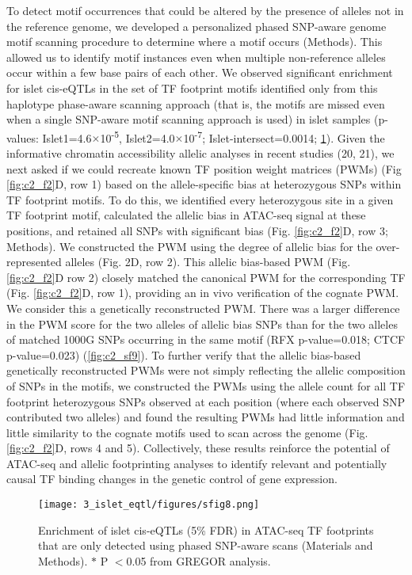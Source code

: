 To detect motif occurrences that could be altered by the presence of alleles not in the reference genome, we developed a personalized phased SNP-aware genome motif scanning procedure to determine where a motif occurs (Methods). This allowed us to identify motif instances even when multiple non-reference alleles occur within a few base pairs of each other. We observed significant enrichment for islet cis-eQTLs in the set of TF footprint motifs identified only from this haplotype phase-aware scanning approach (that is, the motifs are missed even when a single SNP-aware motif scanning approach is used) in islet samples (p-values: Islet1=4.6$\times$10\textsuperscript{-5}, Islet2=4.0$\times$10\textsuperscript{-7}; Islet-intersect=0.0014; \ref{fig:c2_sf8}). Given the informative chromatin accessibility allelic analyses in recent studies (20, 21), we next asked if we could recreate known TF position weight matrices (PWMs) (Fig \ref{fig:c2_f2}D, row 1) based on the allele-specific bias at heterozygous SNPs within TF footprint motifs. To do this, we identified every heterozygous site in a given TF footprint motif, calculated the allelic bias in ATAC-seq signal at these positions, and retained all SNPs with significant bias (Fig. \ref{fig:c2_f2}D, row 3; Methods). We constructed the PWM using the degree of allelic bias for the over-represented alleles (Fig. 2D, row 2). This allelic bias-based PWM (Fig. \ref{fig:c2_f2}D row 2) closely matched the canonical PWM for the corresponding TF (Fig. \ref{fig:c2_f2}D, row 1), providing an in vivo verification of the cognate PWM. We consider this a genetically reconstructed PWM. There was a larger difference in the PWM score for the two alleles of allelic bias SNPs than for the two alleles of matched 1000G SNPs occurring in the same motif (RFX p-value=0.018; CTCF p-value=0.023) (\ref{fig:c2_sf9}). To further verify that the allelic bias-based genetically reconstructed PWMs were not simply reflecting the allelic composition of SNPs in the motifs, we constructed the PWMs using the allele count for all TF footprint heterozygous SNPs observed at each position (where each observed SNP contributed two alleles) and found the resulting PWMs had little information and little similarity to the cognate motifs used to scan across the genome (Fig. \ref{fig:c2_f2}D, rows 4 and 5). Collectively, these results reinforce the potential of ATAC-seq and allelic footprinting analyses to identify relevant and potentially causal TF binding changes in the genetic control of gene expression.

\begin{figure}
    \centering
    \texttt{[image: 3\_islet\_eqtl/figures/sfig8.png]}
    \caption[Enrichment of islet cis-eQTLs (5\% FDR) in ATAC-seq TF footprints that are only detected using phased SNP-aware scans]{Enrichment of islet cis-eQTLs (5\% FDR) in ATAC-seq TF footprints that are only detected using phased SNP-aware scans (Materials and Methods). $\ast$ P $<$0.05 from GREGOR analysis.}
    \label{fig:c2_sf8}
\end{figure}

